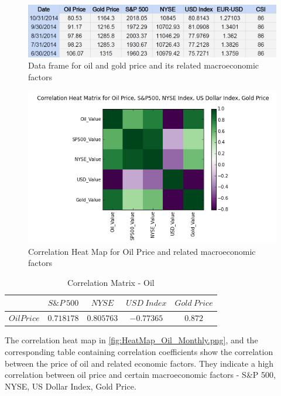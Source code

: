 \documentclass[runningheads]{llncs}
\begin{document}
\begin{figure}
\centering
\includegraphics[width=\textwidth]{DataMatrices.png}
\caption{Data frame for oil and gold price and its related macroeconomic factors}
\label{fig:DataMatrices.png}
\end{figure}

\begin{figure}
\centering
\includegraphics[width=\textwidth]{HeatMap_Oil_Monthly.png}
\caption{Correlation Heat Map for Oil Price and related macroeconomic factors}
\label{fig:HeatMap_Oil_Monthly.png}
\end{figure}

\begin{table}
\begin{center}
\begin{tabular}{|c|c|c|c|c|}
\hline
$ $ & $ S\&P\ 500 $ & $ NYSE $ & $ USD\ Index $ & $Gold\ Price$ \\ \hline
$Oil Price$ & $0.718178$ & $0.805763$ & $-0.77365$ & $0.872$ \\ \hline
\end{tabular}
\end{center}
\caption{Correlation Matrix - Oil}
\end{table}


The correlation heat map in \autoref{fig:HeatMap_Oil_Monthly.png}, and the corresponding table containing correlation coefficients show the correlation between the price of oil and related economic factors. They indicate a high correlation between oil price and certain macroeconomic factors - S\&P 500, NYSE, US Dollar Index, Gold Price.
\end{document}
